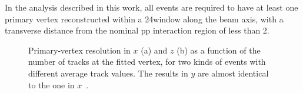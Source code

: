 In the analysis described in this work, all events are required to have at least one primary vertex reconstructed within a 24\cm window along the beam axis, with a transverse distance from the nominal pp interaction region
of less than 2\cm.

\begin{figure}[!htb]
\centering
{}
\caption{Primary-vertex resolution in $x$ (a) and $z$ (b) as a function of the number of tracks at the fitted vertex, for two kinds of events with different average track \pt values. The results in $y$ are almost identical to the one in $x$~\cite{TrkCMSPublicResults}.}
\label{fig:vtx_rel}
\end{figure}
